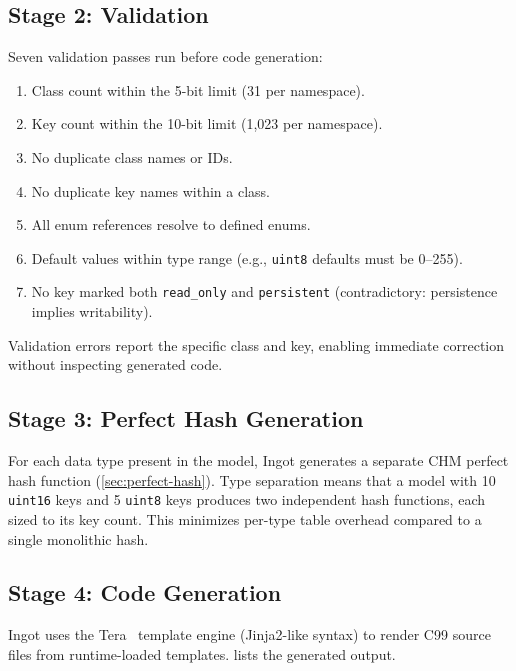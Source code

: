 \documentclass[10pt,twocolumn,letterpaper]{article}
\begin{document}
\subsection{Stage 2: Validation}

Seven validation passes run before code generation:

\begin{enumerate}
    \item Class count within the 5-bit limit (31 per namespace).
    \item Key count within the 10-bit limit (1,023 per namespace).
    \item No duplicate class names or IDs.
    \item No duplicate key names within a class.
    \item All enum references resolve to defined enums.
    \item Default values within type range (e.g., \texttt{uint8}
        defaults must be 0--255).
    \item No key marked both \texttt{read\_only} and
        \texttt{persistent} (contradictory: persistence implies
        writability).
\end{enumerate}

Validation errors report the specific class and key, enabling
immediate correction without inspecting generated code.

\subsection{Stage 3: Perfect Hash Generation}

For each data type present in the model, Ingot generates a separate
CHM perfect hash function (\cref{sec:perfect-hash}).  Type separation
means that a model with 10 \texttt{uint16} keys and 5 \texttt{uint8}
keys produces two independent hash functions, each sized to its key
count.  This minimizes per-type table overhead compared to a single
monolithic hash.

\subsection{Stage 4: Code Generation}

Ingot uses the Tera~\cite{tera} template engine (Jinja2-like syntax)
to render C99 source files from runtime-loaded templates.
 lists the generated output.
\end{document}
